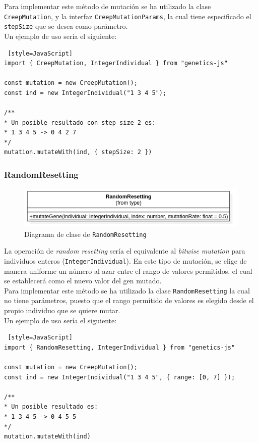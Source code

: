 Para implementar este método de mutación se ha utilizado la clase \texttt{CreepMutation}, y la interfaz \texttt{CreepMutationParams}, la cual tiene especificado el \texttt{stepSize} que se desea como parámetro. \\

Un ejemplo de uso sería el siguiente:

\begin{lstlisting} [style=JavaScript]
import { CreepMutation, IntegerIndividual } from "genetics-js"

const mutation = new CreepMutation();
const ind = new IntegerIndividual("1 3 4 5");

/**
* Un posible resultado con step size 2 es:
* 1 3 4 5 -> 0 4 2 7
*/
mutation.mutateWith(ind, { stepSize: 2 })
\end{lstlisting}

\subsubsection{RandomResetting}

\begin{figure}[ht]
    \centering
    \includegraphics[scale=0.5]{mem/images/cap-4/4.2.7(Mutation)/RandomResetting.png}
    \caption{Diagrama de clase de \texttt{RandomResetting}}
    \label{fig:my_label}
\end{figure}

La operación de \textit{random resetting} sería el equivalente al \textit{bitwise mutation} para individuos enteros (\texttt{IntegerIndividual}). En este tipo de mutación, se elige de manera uniforme un número al azar entre el rango de valores permitidos, el cual se establecerá como el nuevo valor del gen mutado. \\

Para implementar este método se ha utilizado la clase \texttt{RandomResetting} la cual no tiene parámetros, puesto que el rango permitido de valores es elegido desde el propio individuo que se quiere mutar. \\

Un ejemplo de uso sería el siguiente: \\

\begin{lstlisting} [style=JavaScript]
import { RandomResetting, IntegerIndividual } from "genetics-js"

const mutation = new CreepMutation();
const ind = new IntegerIndividual("1 3 4 5", { range: [0, 7] });

/**
* Un posible resultado es:
* 1 3 4 5 -> 0 4 5 5
*/
mutation.mutateWith(ind)
\end{lstlisting}

